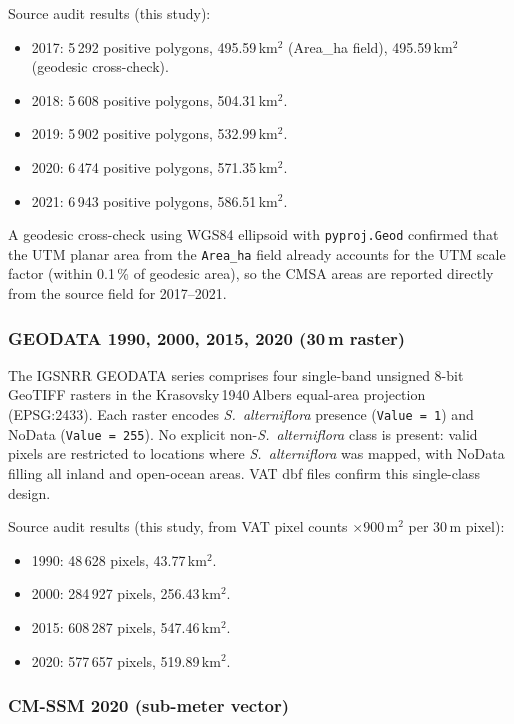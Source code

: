 \documentclass[11pt]{article}
\begin{document}
Source audit results (this study):
\begin{itemize}[nosep]
\item 2017: 5\,292 positive polygons, 495.59\,km$^2$ (Area\_ha field), 495.59\,km$^2$ (geodesic cross-check).
\item 2018: 5\,608 positive polygons, 504.31\,km$^2$.
\item 2019: 5\,902 positive polygons, 532.99\,km$^2$.
\item 2020: 6\,474 positive polygons, 571.35\,km$^2$.
\item 2021: 6\,943 positive polygons, 586.51\,km$^2$.
\end{itemize}
A geodesic cross-check using WGS84 ellipsoid with \texttt{pyproj.Geod} confirmed
that the UTM planar area from the \texttt{Area\_ha} field already accounts for
the UTM scale factor (within 0.1\,\% of geodesic area), so the CMSA areas are
reported directly from the source field for 2017--2021.

\subsubsection{GEODATA 1990, 2000, 2015, 2020 (30\,m raster)}

The IGSNRR GEODATA series comprises four single-band unsigned 8-bit GeoTIFF
rasters in the Krasovsky\,1940\,Albers equal-area projection (EPSG:2433).
Each raster encodes \textit{S.~alterniflora} presence (\texttt{Value = 1})
and NoData (\texttt{Value = 255}). No explicit non-\textit{S.~alterniflora}
class is present: valid pixels are restricted to locations where
\textit{S.~alterniflora} was mapped, with NoData filling all inland and open-ocean
areas. VAT dbf files confirm this single-class design.

Source audit results (this study, from VAT pixel counts $\times 900\,\text{m}^2$
per 30\,m pixel):
\begin{itemize}[nosep]
\item 1990: 48\,628 pixels, 43.77\,km$^2$.
\item 2000: 284\,927 pixels, 256.43\,km$^2$.
\item 2015: 608\,287 pixels, 547.46\,km$^2$.
\item 2020: 577\,657 pixels, 519.89\,km$^2$.
\end{itemize}

\subsubsection{CM-SSM 2020 (sub-meter vector)}
\end{document}
